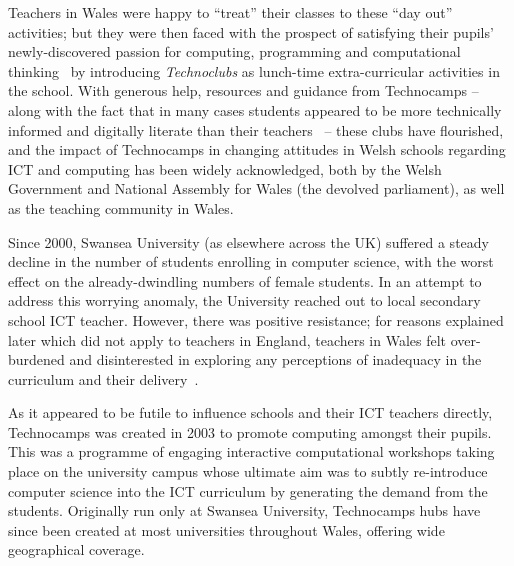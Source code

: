 Teachers in Wales were happy to ``treat'' their classes to these ``day
out'' activities; but they were then faced with the prospect of
satisfying their pupils' newly-discovered passion for computing,
programming and computational
thinking~\cite{wing:2008,calderon-et-al-hci2015} by introducing
{\emph{Technoclubs}} as lunch-time extra-curricular activities in the
school.  With generous help, resources and guidance from Technocamps
-- along with the fact that in many cases students appeared to be more
technically informed and digitally literate than their
teachers~\cite{sentance-et-al-wipsce2012} -- these clubs have
flourished, and the impact of Technocamps in changing attitudes in
Welsh schools regarding ICT and computing has been widely
acknowledged, both by the Welsh Government and National Assembly for
Wales (the devolved parliament), as well as the teaching
community in Wales.

Since 2000, Swansea University (as elsewhere across the UK) suffered a
steady decline in the number of students enrolling in computer
science, with the worst effect on the already-dwindling numbers of
female students.  In an attempt to address this worrying anomaly, the
University reached out to local secondary school ICT teacher.
However, there was positive resistance; for reasons explained later
which did not apply to teachers in England, teachers in Wales felt
over-burdened and disinterested in exploring any perceptions of
inadequacy in the curriculum and their
delivery~\cite{crick+sentance:2011,brown-et-al-sigcse2012}.

As it appeared to be futile to influence schools and their ICT
teachers directly, Technocamps was created in 2003 to promote
computing amongst their pupils.  This was a programme of engaging
interactive computational workshops taking place on the university
campus whose ultimate aim was to subtly re-introduce computer science
into the ICT curriculum by generating the demand from the students.
Originally run only at Swansea University, Technocamps hubs have since
been created at most universities throughout Wales, offering wide
geographical coverage.

